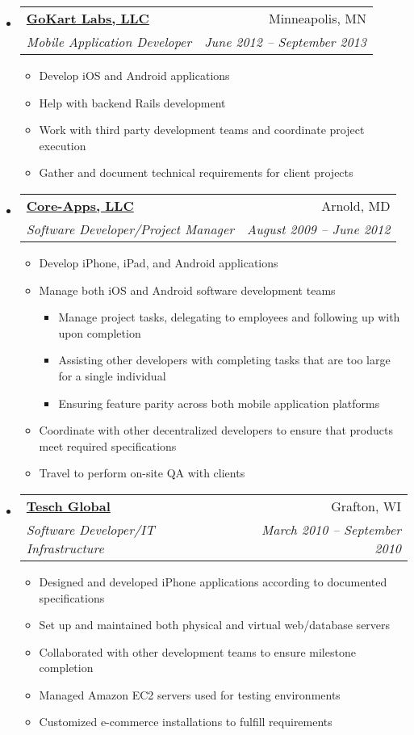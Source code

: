 \documentclass[letterpaper,12pt]{article}
\makeatletter
\newcommand{\resitem}[1]{\item #1 \vspace{-2pt}}
\newcommand{\ressubheading}[4]{
\begin{tabular*}{6.5in}{l@{\extracolsep{\fill}}r}
		\textbf{#1} & #2 \\
		\textit{#3} & \textit{#4} \\
\end{tabular*}\vspace{-6pt}}
\makeatother
\begin{document}
\begin{itemize}
{         }
     \item
			\ressubheading{\href{http://www.gokartlabs.com}{GoKart Labs, LLC}}{Minneapolis, MN}{Mobile Application Developer}{June 2012 -- September 2013}
				{ \footnotesize
				\begin{itemize}
					\resitem{Develop iOS and Android applications}
					\resitem{Help with backend Rails development}
					\resitem{Work with third party development teams and coordinate project execution}
					\resitem{Gather and document technical requirements for client projects}
				\end{itemize}
         }
     \item
			\ressubheading{\href{http://www.core-apps.com/Home.html}{Core-Apps, LLC}}{Arnold, MD}{Software Developer/Project Manager}{August 2009 -- June 2012}
				{ \footnotesize
				\begin{itemize}
					\resitem{Develop iPhone, iPad, and Android applications}
					\resitem{Manage both iOS and Android software development teams}
						\begin{itemize}
							\resitem{Manage project tasks, delegating to employees and following  up with upon completion}
							\resitem{Assisting other developers with completing tasks that are too large for a single individual}
							\resitem{Ensuring feature parity across both mobile application platforms}
						\end{itemize}
					\resitem{Coordinate with other decentralized developers to ensure that products meet required specifications}
					\resitem{Travel to perform on-site QA with clients}
				\end{itemize}
         }
     \item
			\ressubheading{\href{http://www.teschglobal.com/}{Tesch Global}}{Grafton, WI}{Software Developer/IT Infrastructure}{March 2010 -- September 2010}
				{ \footnotesize
				\begin{itemize}
					\resitem{Designed and developed iPhone applications according to documented specifications}
					\resitem{Set up and maintained both physical and virtual web/database servers}
					\resitem{Collaborated with other development teams to ensure milestone completion}
					\resitem{Managed Amazon EC2 servers used for testing environments}
					\resitem{Customized e-commerce installations to fulfill requirements}
				\end{itemize}
         }


\end{itemize}
\end{document}
